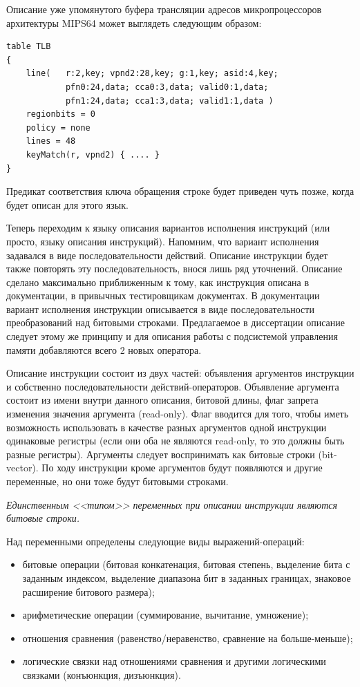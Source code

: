 \documentclass[14pt]{extreport}
\begin{document}
Описание уже упомянутого буфера трансляции адресов микропроцессоров архитектуры MIPS64 может выглядеть следующим образом:
\begin{verbatim}
table TLB
{
    line(   r:2,key; vpnd2:28,key; g:1,key; asid:4,key;
            pfn0:24,data; cca0:3,data; valid0:1,data;
            pfn1:24,data; cca1:3,data; valid1:1,data )
    regionbits = 0
    policy = none
    lines = 48
    keyMatch(r, vpnd2) { .... }
}
\end{verbatim}

Предикат соответствия ключа обращения строке будет приведен чуть позже, когда будет описан для этого язык.

Теперь переходим к языку описания вариантов исполнения инструкций (или просто, языку описания инструкций). Напомним, что вариант исполнения задавался в виде последовательности действий. Описание инструкции будет также повторять эту последовательность, внося лишь ряд уточнений. Описание сделано максимально приближенным к тому, как инструкция описана в документации, в привычных тестировщикам документах. В документации вариант исполнения инструкции описывается в виде последовательности преобразований над битовыми строками. Предлагаемое в диссертации описание следует этому же принципу и для описания работы с подсистемой управления памяти добавляются всего 2 новых оператора.

Описание инструкции состоит из двух частей: объявления аргументов инструкции и собственно последовательности действий-операторов. Объявление аргумента состоит из имени внутри данного описания, битовой длины, флаг запрета изменения значения аргумента (read-only). Флаг вводится для того, чтобы иметь возможность использовать в качестве разных аргументов одной инструкции одинаковые регистры (если они оба не являются read-only, то это должны быть разные регистры). Аргументы следует воспринимать как битовые строки (bit-vector). По ходу инструкции кроме аргументов будут появляются и другие переменные, но они тоже будут битовыми строками.

\emph{Единственным <<типом>> переменных при описании инструкции являются битовые строки.}

Над переменными определены следующие виды выражений-операций:
\begin{itemize}
    \item битовые операции (битовая конкатенация, битовая степень, выделение бита с заданным индексом, выделение диапазона бит в заданных границах, знаковое расширение битового размера);
    \item арифметические операции (суммирование, вычитание, умножение);
    \item отношения сравнения (равенство/неравенство, сравнение на больше-меньше);
    \item логические связки над отношениями сравнения и другими логическими связками (конъюнкция, дизъюнкция).
\end{itemize}
\end{document}
